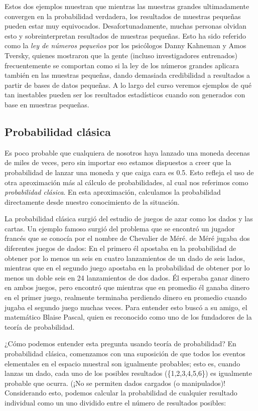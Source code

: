 \documentclass[
  12pt,
]{book}
\begin{document}
Estos dos ejemplos muestran que mientras las muestras grandes ultimadamente convergen en la probabilidad verdadera, los resultados de muestras pequeñas pueden estar muy equivocados. Desafortunadamente, muchas personas olvidan esto y sobreinterpretan resultados de muestras pequeñas. Esto ha sido referido como la \emph{ley de números pequeños} por los psicólogos Danny Kahneman y Amos Tversky, quienes mostraron que la gente (incluso investigadores entrenados) frecuentemente se comportan como si la ley de los números grandes aplicara también en las muestras pequeñas, dando demasiada credibilidad a resultados a partir de bases de datos pequeñas. A lo largo del curso veremos ejemplos de qué tan inestables pueden ser los resultados estadísticos cuando son generados con base en muestras pequeñas.

\hypertarget{probabilidad-cluxe1sica}{%
\subsection{Probabilidad clásica}\label{probabilidad-cluxe1sica}}

Es poco probable que cualquiera de nosotros haya lanzado una moneda decenas de miles de veces, pero sin importar eso estamos dispuestos a creer que la probabilidad de lanzar una moneda y que caiga cara es 0.5. Esto refleja el uso de otra aproximación más al cálculo de probabilidades, al cual nos referimos como \emph{probabilidad clásica}. En esta aproximación, calculamos la probabilidad directamente desde nuestro conocimiento de la situación.

La probabilidad clásica surgió del estudio de juegos de azar como los dados y las cartas. Un ejemplo famoso surgió del problema que se encontró un jugador francés que se conocía por el nombre de Chevalier de Méré. de Méré jugaba dos diferentes juegos de dados: En el primero él apostaba en la probabilidad de obtener por lo menos un seis en cuatro lanzamientos de un dado de seis lados, mientras que en el segundo juego apostaba en la probabilidad de obtener por lo menos un doble seis en 24 lanzamientos de dos dados. Él esperaba ganar dinero en ambos juegos, pero encontró que mientras que en promedio él ganaba dinero en el primer juego, realmente terminaba perdiendo dinero en promedio cuando jugaba el segundo juego muchas veces. Para entender esto buscó a su amigo, el matemático Blaise Pascal, quien es reconocido como uno de los fundadores de la teoría de probabilidad.

¿Cómo podemos entender esta pregunta usando teoría de probabilidad? En probabilidad clásica, comenzamos con una suposición de que todos los eventos elementales en el espacio muestral son igualmente probables; esto es, cuando lanzas un dado, cada uno de los posibles resultados (\{1,2,3,4,5,6\}) es igualmente probable que ocurra. (¡No se permiten dados cargados (o manipulados)! Considerando esto, podemos calcular la probabilidad de cualquier resultado individual como un uno dividido entre el número de resultados posibles:
\end{document}

